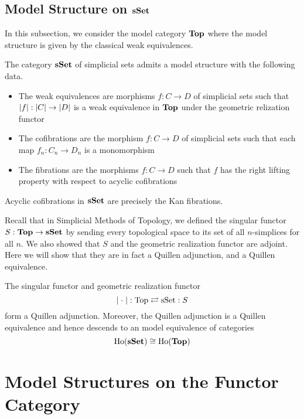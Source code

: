 \documentclass[a4paper]{article}
\begin{document}
\subsection{Model Structure on $\bold{sSet}$}
In this subsection, we consider the model category $\bold{Top}$ where the model structure is given by the classical weak equivalences. 

\begin{thm}{}{} The category $\bold{sSet}$ of simplicial sets admits a model structure with the following data. 
\begin{itemize}
\item The weak equivalences are morphisms $f:C\to D$ of simplicial sets such that $\abs{f}:\abs{C}\to\abs{D}$ is a weak equivalence in $\bold{Top}$ under the geometric relization functor
\item The cofibrations are the morphism $f:C\to D$ of simplicial sets such that each map $f_n:C_n\to D_n$ is a monomorphism
\item The fibrations are the morphisms $f:C\to D$ such that $f$ has the right lifting property with respect to acyclic cofibrations
\end{itemize}
\end{thm}

\begin{lmm}{}{} Acyclic cofibrations in $\bold{sSet}$ are precisely the Kan fibrations. 
\end{lmm}

Recall that in Simplicial Methods of Topology, we defined the singular functor $S:\bold{Top}\to\bold{sSet}$ by sending every topological space to its set of all $n$-simplices for all $n$. We also showed that $S$ and the geometric realization functor are adjoint. Here we will show that they are in fact a Quillen adjunction, and a Quillen equivalence. 

\begin{thm}{}{} The singular functor and geometric realization functor $$\abs{\;\cdot\;}:\text{Top}\rightleftarrows\text{sSet}:S$$ form a Quillen adjunction. Moreover, the Quillen adjunction is a Quillen equivalence and hence descends to an model equivalence of categories $$\text{Ho}(\bold{sSet})\cong\text{Ho}(\bold{Top})$$
\end{thm}

\pagebreak
\section{Model Structures on the Functor Category}
\end{document}
